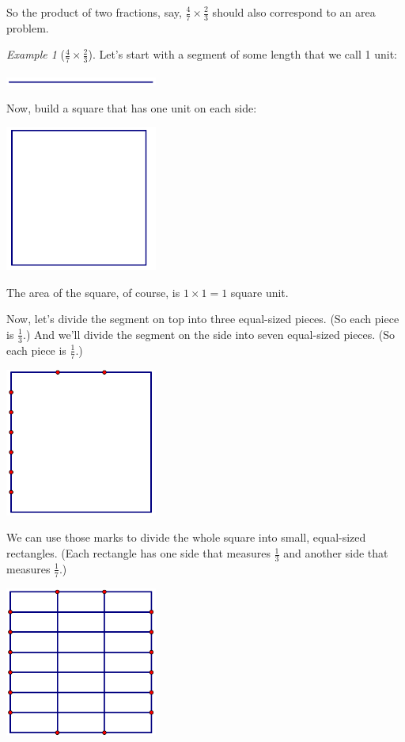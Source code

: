 \documentclass[10pt, reqno]{amsart}
\theoremstyle{remark}
\newtheorem{example}[thm]{Example}
\theoremstyle{definition}
\numberwithin{equation}{section}  %
\begin{document}
So the product of two fractions, say, $\frac 4 7 \times \frac 2 3$
should also correspond to an area
problem.


\begin{example}[$\frac 4 7 \times \frac 2 3$]
Let's  start with a  segment of some length that we call 1 unit:
\begin{center}
 \includegraphics[width = 5cm]{unitseg}
\end{center}
Now, build a square that has one unit on each side:
\begin{center}
 \includegraphics[width = 5cm]{unitsq}
\end{center}
The area of the square, of course, is $1 \times 1 = 1$ square unit.

Now, let's divide the segment on top into three equal-sized pieces.  (So each piece is $\frac 1 3$.)  And we'll divide the segment on the side into seven equal-sized pieces.  (So each piece is $\frac 1 7$.)
\begin{center}
 \includegraphics[width = 5cm]{unitsqdiv}
\end{center}
We can use those marks to divide the whole square into small, equal-sized rectangles.  (Each rectangle has one side that measures $\frac 1 3$ and another side that measures $\frac 1 7$.)
\begin{center}
 \includegraphics[width = 5cm]{unitsqdiv2}
\end{center}




\end{example}
\end{document}
